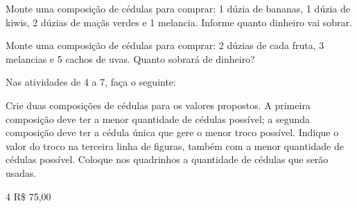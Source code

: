 \begin{escolha}
\item Monte uma composição de cédulas para comprar: 1 dúzia de bananas, 1 dúzia de kiwis, 2 dúzias de maçãs verdes e 1 melancia. Informe quanto dinheiro vai sobrar.
\reduline{\mbox{}\hfill}
\reduline{\mbox{}\hfill}
\reduline{\mbox{}\hfill}

\item Monte uma composição de cédulas para comprar: 2 dúzias de cada fruta, 3 melancias e 5 cachos de uvas. Quanto sobrará de dinheiro?
\reduline{\mbox{}\hfill}
\reduline{\mbox{}\hfill}
\reduline{\mbox{}\hfill}
\end{escolha}

\pagebreak
Nas atividades de 4 a 7, faça o seguinte:

Crie duas composições de cédulas para os valores propostos. A primeira composição deve ter a menor quantidade de cédulas possível; a segunda composição deve ter a cédula única que gere o menor troco possível. Indique o valor do troco na terceira linha de figuras, também com a menor quantidade de cédulas possível. Coloque nos quadrinhos a quantidade de cédulas que serão usadas.



\num{4} R\$ 75,00

